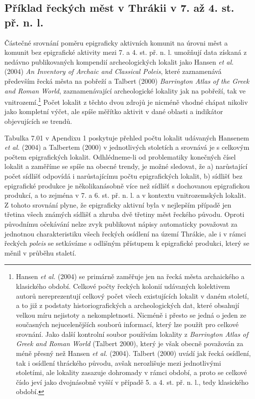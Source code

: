 \subsection[příklad-řeckých-měst-v-thrákii-v-7.-až-4.-st.-př.-n.-l.]{Příklad řeckých měst v Thrákii v 7. až 4. st. př. n. l.}

Částečné srovnání poměru epigraficky aktivních komunit na úrovni měst a komunit bez epigrafické aktivity mezi 7. a 4. st. př. n. l. umožňují data získaná z nedávno publikovaných kompendií archeologických lokalit jako Hansen {\em et al.} (2004) {\em An Inventory of Archaic and Classical Poleis}, které zaznamenává především řecká města na pobřeží a Talbert (2000) {\em Barrington Atlas of the Greek and Roman World}, zaznamenávající archeologické lokality jak na pobřeží, tak ve vnitrozemí.\footnote{Hansen {\em et al.} (2004) se primárně zaměřuje jen na řecká města archaického a klasického období. Celkové počty řeckých kolonií udávaných kolektivem autorů nereprezentují celkový počet všech existujících lokalit v daném století, a to již z podstaty historiografických a archeologických dat, které obsahují velkou míru nejistoty a nekompletnosti. Nicméně i přesto se jedná o jeden ze současných nejucelenějších souborů informací, který lze použít pro celkové srovnání. Jako další kontrolní soubor používám lokality z {\em Barrington Atlas of Greek and Roman World} (Talbert 2000), který je však obecně považován za méně přesný než Hansen {\em et al.} (2004). Talbert (2000) uvádí jak řecká osídlení, tak i osídlení thráckého původu, avšak nerozlišuje mezi jednotlivými stoletími, ale lokality zasazuje dohromady v rámci období, a proto se celkové číslo jeví jako dvojnásobně vyšší v případě 5. a 4. st. př. n. l., tedy klasického období.} Počet lokalit z těchto dvou zdrojů je nicméně vhodné chápat nikoliv jako kompletní výčet, ale spíše měřítko aktivit v dané oblasti a indikátor objevujících se trendů.

Tabulka 7.01 v Apendixu 1 poskytuje přehled počtu lokalit udávaných Hansenem {\em et al.} (2004) a Talbertem (2000) v jednotlivých stoletích a srovnává je s celkovým počtem epigrafických lokalit. Odhlédneme-li od problematiky konečných čísel lokalit a zaměříme se spíše na obecné trendy, je možné sledovat, že a) narůstající počet sídlišť odpovídá i narůstajícímu počtu epigrafických lokalit, b) sídlišť bez epigrafické produkce je několikanásobně více než sídlišť s dochovanou epigrafickou produkcí, a to zejména v 7. a 6. st. př. n. l. a v kontextu vnitrozemských lokalit. Z tohoto srovnání plyne, že epigraficky aktivní byla v nejlepším případě jen třetina všech známých sídlišť a zhruba dvě třetiny měst řeckého původu. Oproti původnímu očekávání nelze zvyk publikovat nápisy automaticky považovat za jednotnou charakteristiku všech řeckých osídlení na území Thrákie, ale i v rámci řeckých {\em poleis} se setkáváme s odlišným přístupem k epigrafické produkci, který se měnil v průběhu staletí.

